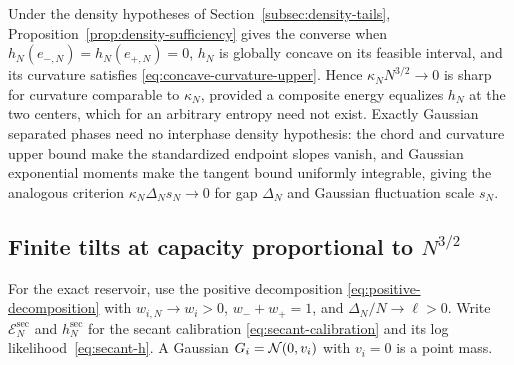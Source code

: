 Under the density hypotheses of Section~\ref{subsec:density-tails},
Proposition~\ref{prop:density-sufficiency} gives the converse when
$h_N(e_{-,N})=h_N(e_{+,N})=0$, $h_N$ is globally concave on its
feasible interval, and its curvature satisfies
\eqref{eq:concave-curvature-upper}. Hence $\kappa_NN^{3/2}\to0$ is sharp for
curvature comparable to $\kappa_N$, provided a composite energy
equalizes $h_N$ at the two centers, which for an arbitrary entropy
need not exist.
Exactly Gaussian separated phases need no interphase density
hypothesis: the chord and curvature upper bound make the standardized
endpoint slopes vanish, and Gaussian exponential moments make the
tangent bound uniformly integrable, giving the analogous criterion
$\kappa_N\Delta_Ns_N\to0$ for gap $\Delta_N$ and Gaussian fluctuation
scale $s_N$.

\subsection{Finite tilts at capacity proportional to \texorpdfstring{$N^{3/2}$}{N to the power 3/2}}

For the exact reservoir, use the positive decomposition
\eqref{eq:positive-decomposition} with $w_{i,N}\to w_i>0$,
$w_-+w_+=1$, and $\Delta_N/N\to\ell>0$. Write
$\mathcal E_N^{\mathrm{sec}}$ and $h_N^{\mathrm{sec}}$ for the secant
calibration \eqref{eq:secant-calibration} and its log
likelihood~\eqref{eq:secant-h}. A Gaussian $G_i=\mathcal N(0,v_i)$ with
$v_i=0$ is a point mass.

